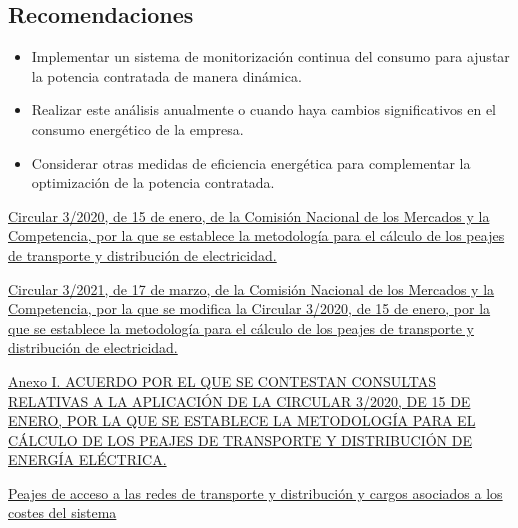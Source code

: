 \documentclass[a4paper,10pt]{article}
\begin{document}
\begin{Form}
\section{Recomendaciones}
\begin{itemize}
    \item Implementar un sistema de monitorización continua del consumo para ajustar la potencia contratada de manera dinámica.
    \item Realizar este análisis anualmente o cuando haya cambios significativos en el consumo energético de la empresa.
    \item Considerar otras medidas de eficiencia energética para complementar la optimización de la potencia contratada.
\end{itemize}
















\begin{thebibliography}{99}





\href{https://www.boe.es/buscar/doc.php?id=BOE-A-2020-1066
}
{
Circular 3/2020, de 15 de enero, de la Comisión Nacional de los Mercados y la Competencia, por la que se establece la metodología para el cálculo de los peajes de transporte y distribución de electricidad.
}

\href{https://www.boe.es/buscar/doc.php?id=BOE-A-2021-4518
}
{
Circular 3/2021, de 17 de marzo, de la Comisión Nacional de los Mercados y la Competencia, por la que se modifica la Circular 3/2020, de 15 de enero, por la que se establece la metodología para el cálculo de los peajes de transporte y distribución de electricidad.
}


\href{https://www.cnmc.es/sites/default/files/3416756_135.pdf
}
{Anexo I. ACUERDO POR EL QUE SE CONTESTAN CONSULTAS RELATIVAS A LA
APLICACIÓN DE LA CIRCULAR 3/2020, DE 15 DE ENERO, POR LA QUE SE
ESTABLECE LA METODOLOGÍA PARA EL CÁLCULO DE LOS PEAJES DE
TRANSPORTE Y DISTRIBUCIÓN DE ENERGÍA ELÉCTRICA.}


\href{https://www.miteco.gob.es/es/energia/energia-electrica/electricidad/peajes.html
}
{
Peajes de acceso a las redes de transporte y distribución y cargos asociados a los costes del sistema
}




\end{thebibliography}
\end{Form}
\end{document}
